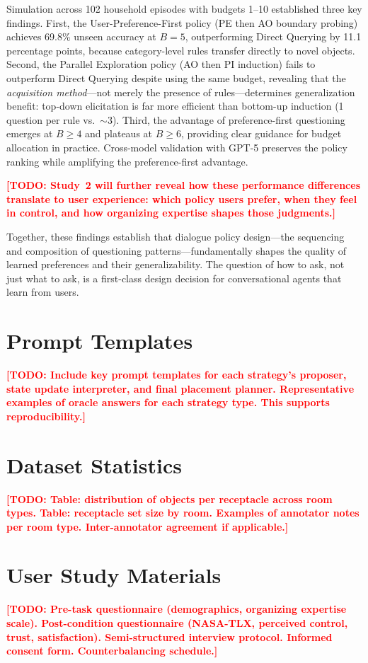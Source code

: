 \documentclass[a4paper,fleqn]{cas-sc}
\newcommand{\TODO}[1]{\textcolor{red}{\textbf{[TODO: #1]}}}
\begin{document}
Simulation across 102 household episodes with budgets 1--10 established three key findings. First, the User-Preference-First policy (PE then AO boundary probing) achieves 69.8\% unseen accuracy at $B=5$, outperforming Direct Querying by 11.1 percentage points, because category-level rules transfer directly to novel objects. Second, the Parallel Exploration policy (AO then PI induction) fails to outperform Direct Querying despite using the same budget, revealing that the \emph{acquisition method}---not merely the presence of rules---determines generalization benefit: top-down elicitation is far more efficient than bottom-up induction (1 question per rule vs.\ $\sim$3). Third, the advantage of preference-first questioning emerges at $B \geq 4$ and plateaus at $B \geq 6$, providing clear guidance for budget allocation in practice. Cross-model validation with GPT-5 preserves the policy ranking while amplifying the preference-first advantage.

\TODO{Study~2 will further reveal how these performance differences translate to user experience: which policy users prefer, when they feel in control, and how organizing expertise shapes those judgments.}

Together, these findings establish that dialogue policy design---the sequencing and composition of questioning patterns---fundamentally shapes the quality of learned preferences and their generalizability. The question of how to ask, not just what to ask, is a first-class design decision for conversational agents that learn from users.





\appendix

\section{Prompt Templates}\label{app:prompts}
\TODO{Include key prompt templates for each strategy's proposer, state update interpreter, and final placement planner. Representative examples of oracle answers for each strategy type. This supports reproducibility.}

\section{Dataset Statistics}\label{app:dataset}
\TODO{Table: distribution of objects per receptacle across room types. Table: receptacle set size by room. Examples of annotator notes per room type. Inter-annotator agreement if applicable.}

\section{User Study Materials}\label{app:userstudy}
\TODO{Pre-task questionnaire (demographics, organizing expertise scale). Post-condition questionnaire (NASA-TLX, perceived control, trust, satisfaction). Semi-structured interview protocol. Informed consent form. Counterbalancing schedule.}
\end{document}
